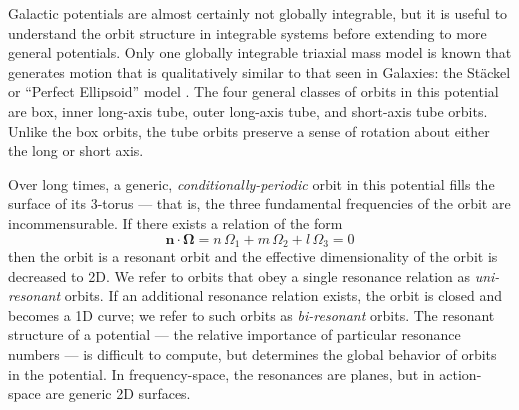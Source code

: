 \documentclass[letterpaper,12pt,preprint]{aastex}
\begin{document}
Galactic potentials are almost certainly not globally integrable, but it is useful to understand the orbit structure in integrable systems before extending to more general potentials. Only one globally integrable triaxial mass model is known that generates motion that is qualitatively similar to that seen in Galaxies: the St\"ackel or ``Perfect Ellipsoid'' model \citep[e.g.,][]{kuzmin56, kuzmin73, deZeeuw85, cincotta06}. The four general classes of orbits in this potential are box, inner long-axis tube, outer long-axis tube, and short-axis tube orbits. Unlike the box orbits, the tube orbits preserve a sense of rotation about either the long or short axis.

Over long times, a generic, \emph{conditionally-periodic} orbit in this potential fills the surface of its 3-torus --- that is, the three fundamental frequencies of the orbit are incommensurable. If there exists a relation of the form
\begin{equation}
	\boldsymbol{n} \cdot \boldsymbol{\Omega} = n\, \Omega_1 + m\, \Omega_2 + l\, \Omega_3 = 0
\end{equation}
then the orbit is a resonant orbit and the effective dimensionality of the orbit is decreased to 2D. We refer to orbits that obey a single resonance relation as \emph{uni-resonant} orbits. If an additional resonance relation exists, the orbit is closed and becomes a 1D curve; we refer to such orbits as \emph{bi-resonant} orbits. The resonant structure of a potential --- the relative importance of particular resonance numbers --- is difficult to compute, but determines the global behavior of orbits in the potential. In frequency-space, the resonances are planes, but in action-space are generic 2D surfaces. %
\end{document}
